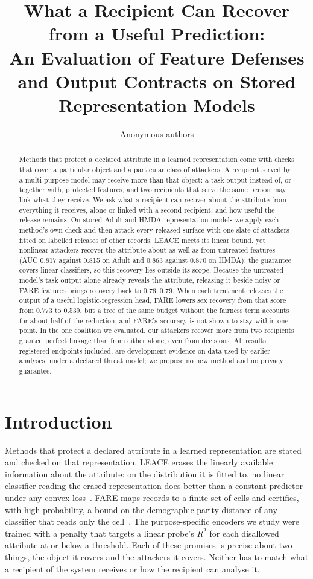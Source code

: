 \documentclass[10pt]{article}
\title{What a Recipient Can Recover from a Useful Prediction:\\
An Evaluation of Feature Defenses and Output Contracts on Stored Representation Models}
\author{Anonymous authors}
\date{}
\begin{document}
\maketitle

\begin{abstract}
Methods that protect a declared attribute in a learned representation come with checks that cover a particular object
and a particular class of attackers. A recipient served by a multi-purpose model may receive more than that object: a
task output instead of, or together with, protected features, and two recipients that serve the same person may link
what they receive. We ask what a recipient can recover about the attribute from everything it receives, alone or linked
with a second recipient, and how useful the release remains. On stored Adult and HMDA representation models we apply
each method's own check and then attack every released surface with one slate of attackers fitted on labelled releases
of other records. LEACE meets its linear bound, yet nonlinear attackers recover the attribute about as well as
from untreated features (AUC 0.817 against 0.815 on Adult and 0.863 against 0.870 on HMDA); the guarantee covers linear
classifiers, so this recovery lies outside its scope. Because the untreated model's task output alone already reveals
the attribute, releasing it beside noisy or FARE features brings recovery back to 0.76--0.79. When each treatment
releases the output of a useful logistic-regression head, FARE lowers sex recovery from that score from 0.773 to 0.539,
but a tree of the same budget without the fairness term accounts for about half of the reduction, and FARE's accuracy is
not shown to stay within one point. In the one coalition we evaluated, our attackers recover more from two recipients granted perfect linkage than from
either alone, even from decisions. All results, registered endpoints included, are development evidence on data used by earlier analyses, under a
declared threat model; we propose no new method and no privacy guarantee.
\end{abstract}

\section{Introduction}

Methods that protect a declared attribute in a learned representation are stated and checked on that representation.
LEACE erases the linearly available information about the attribute: on the distribution it is fitted to, no linear
classifier reading the erased representation does better than a constant predictor under any convex
loss~\citep{belrose2023leace}. FARE maps records to a finite set of cells and certifies, with high probability, a bound
on the demographic-parity distance of any classifier that reads only the cell~\citep{jovanovic2023fare}. The purpose-specific encoders we study were trained with a penalty that targets a linear probe's $R^2$ for each
disallowed attribute at or below a threshold. Each of these promises is precise about two things, the object it covers and the attackers it covers.
Neither has to match what a recipient of the system receives or how the recipient can analyse it.
\end{document}
